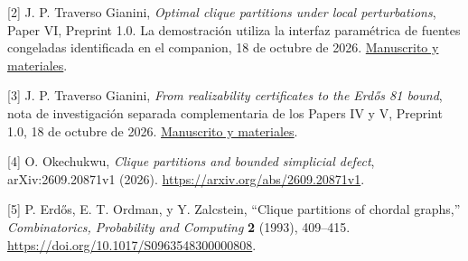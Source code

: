 \documentclass[spanish,11pt,a4paper]{article}
\begin{document}
{[}2{]} J. P. Traverso Gianini, \emph{Optimal clique partitions under
local perturbations}, Paper VI, Preprint 1.0. La demostración utiliza la
interfaz paramétrica de fuentes congeladas identificada en el companion,
18 de octubre de 2026.
\href{https://github.com/jtraverso/erdos-81-chordal-clique-partitions/tree/main/preprints/PAPER_VI}{Manuscrito
y materiales}.

{[}3{]} J. P. Traverso Gianini, \emph{From realizability certificates to
the Erdős 81 bound}, nota de investigación separada complementaria de
los Papers IV y V, Preprint 1.0, 18 de octubre de 2026.
\href{https://github.com/jtraverso/erdos-81-chordal-clique-partitions/tree/main/series_notes/NOTE_I_ERDOS81_TRANSFER}{Manuscrito
y materiales}.

{[}4{]} O. Okechukwu, \emph{Clique partitions and bounded simplicial
defect}, arXiv:2609.20871v1 (2026).
\url{https://arxiv.org/abs/2609.20871v1}.

{[}5{]} P. Erdős, E. T. Ordman, y Y. Zalcstein, ``Clique partitions of
chordal graphs,'' \emph{Combinatorics, Probability and Computing}
\textbf{2} (1993), 409--415.
\url{https://doi.org/10.1017/S0963548300000808}.
\end{document}
